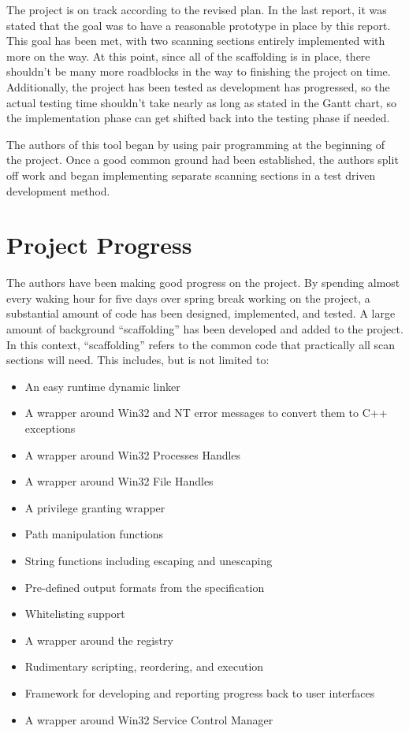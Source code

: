 \documentclass[letterpaper,12pt]{article}
\begin{document}
The project is on track according to the revised plan.  In the last report, it
was stated that the goal was to have a reasonable prototype in place by this
report.  This goal has been met, with two scanning sections entirely
implemented with more on the way.  At this point, since all of the scaffolding
is in place, there shouldn't be many more roadblocks in the way to finishing the
project on time.  Additionally, the project has been tested as development has
progressed, so the actual testing time shouldn't take nearly as long as stated
in the Gantt chart, so the implementation phase can get shifted back into the
testing phase if needed.  

The authors of this tool began by using pair programming at the beginning of the
project.  Once a good common ground had been established, the authors split off
work and began implementing separate scanning sections in a test driven
development method.  

\newpage



\section{Project Progress} \label{project_progress}
The authors have been making good progress on the project.  By spending almost
every waking hour for five days over spring break working on the project, a
substantial amount of code has been designed, implemented, and tested.  A large
amount of background ``scaffolding'' has been developed and added to the
project.  In this context, ``scaffolding'' refers to the common code that
practically all scan sections will need.  This includes, but is not limited to:

\begin{itemize}
  \item An easy runtime dynamic linker
  \item A wrapper around Win32 and NT error messages to convert them to C++
  exceptions
  \item A wrapper around Win32 Processes Handles
  \item A wrapper around Win32 File Handles
  \item A privilege granting wrapper
  \item Path manipulation functions
  \item String functions including escaping and unescaping
  \item Pre-defined output formats from the specification
  \item Whitelisting support
  \item A wrapper around the registry
  \item Rudimentary scripting, reordering, and execution
  \item Framework for developing and reporting progress back to user interfaces
  \item A wrapper around Win32 Service Control Manager 
\end{itemize}
\end{document}
